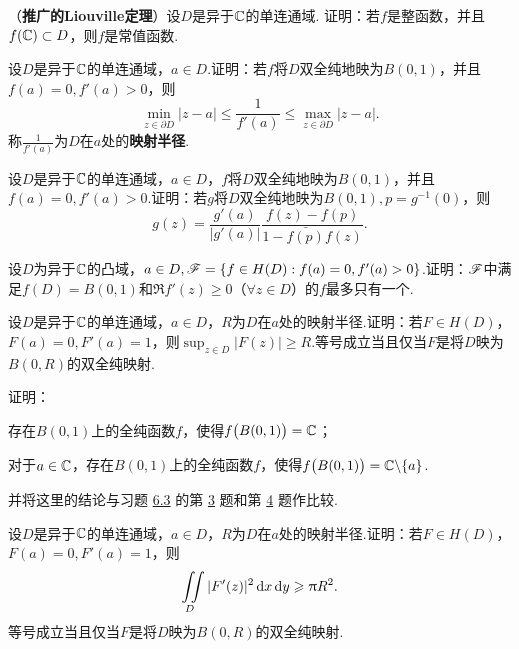 \begin{xiti}\hypertarget{xiti7.2}{}
  \item （\textbf{推广的Liouville定理}）设$D$是异于$\mathbb C$的单连通域. 证明：若$f$是整函数，并且$f(\mathbb C)\subset D$，则$f$是常值函数.
  \item 设$D$是异于$\mathbb C$的单连通域，$a\in D$.证明：若$f$将$D$双全纯地映为$B(0,1)$，并且$f(a)=0,f'(a)>0$，则
      \[
        \min_{z\in\partial D}|z-a| \le \frac1{f'(a)}\le\max_{z\in\partial D}|z-a|.
      \]
      称$\frac1{f'(a)}$为$D$在$a$处的\textbf{映射半径}.
  \item 设$D$是异于$\mathbb C$的单连通域，$a\in D$，$f$将$D$双全纯地映为$B(0,1)$，并且$f(a)=0,f'(a)>0$.证明：若$g$将$D$双全纯地映为$B(0,1),p=g^{-1}(0)$，则
      \[
        g(z) = \frac{g'(a)}{|g'(a)|}\frac{f(z)-f(p)}{1-\bar{f(p)}f(z)}.
      \]
  \item 设$D$为异于$\mathbb C$的凸域，$a\in D,\mathscr F=\{f\in H(D):f(a)=0,f'(a)>0\}$.证明：$\mathscr F$中满足$f(D)=B(0,1)$和$\Re f'(z)\ge0$（$\forall z\in D$）的$f$最多只有一个.
  \item 设$D$是异于$\mathbb C$的单连通域，$a\in D$，$R$为$D$在$a$处的映射半径.证明：若$F\in H(D) $，$F(a)=0,F'(a)=1$，则$\sup_{z\in D}|F(z)|\ge R$.等号成立当且仅当$F$是将$D$映为$B(0,R)$的双全纯映射.
  \item 证明：
    \begin{enuma}
      \item 存在$B(0,1)$上的全纯函数$f$，使得$f\big(B(0,1)\big)=\mathbb C$；
      \item 对于$a\in \mathbb C$，存在$B(0,1)$上的全纯函数$f$，使得$f\big(B(0,1)\big)=\mathbb C\backslash\{a\}$.
    \end{enuma}
       并将这里的结论与习题 \hyperlink{xiti6.3}{6.3} 的第 \hyperlink{xiti6.3.3}{3} 题和第 \hyperlink{xiti6.3.3}{4} 题作比较.
  \item 设$D$是异于$\mathbb C$的单连通域，$a\in D$，$R$为$D$在$a$处的映射半径.证明：若$F\in H(D)$，$F(a)=0,F'(a)=1$，则
       \[
         \iint\limits_D|F'(z)|^2\mathop{}\!\mathrm dx\mathop{}\!\mathrm dy\geqslant\uppi R^2.
       \]
       等号成立当且仅当$F$是将$D$映为$B(0,R)$的双全纯映射.
\end{xiti}

